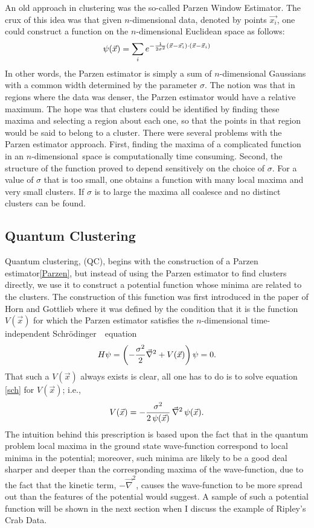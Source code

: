 \documentclass[fleqn,twoside]{article}
\def\be{\begin{equation}}
\def\ee{\end{equation}}
\newcommand{\Schrodinger}{Schr\"odinger\ }
\begin{document}
An old approach in clustering was the so-called Parzen Window
Estimator. The crux of this idea was that given $n$-dimensional
data, denoted by points $\vec{x_i}$, one could construct a function
on the $n$-dimensional Euclidean space as follows:
\be
    \psi(\vec{x}) = \sum_i
e^{-{1 \over 2 \sigma^2}(\vec{x} - \vec{x_i})\cdot (\vec{x} - \vec{x}_i)}
\label{Parzen}
\ee
In other words, the Parzen estimator is simply a sum of $n$-dimensional
Gaussians with a common width determined by the parameter $\sigma$.
The notion was that in regions where the data was denser, the Parzen estimator
would have a relative maximum.  The hope was that clusters could be
identified by finding these maxima and selecting a region about each
one, so that the points in that region would be said to belong to a
cluster.  There were several problems with the Parzen estimator approach.
First, finding the maxima of a complicated function in an $n$-dimensional\
space is computationally time consuming.  Second, the structure of the
function proved to depend sensitively on the choice of $\sigma$.  For
a value of $\sigma$ that is too small, one obtains a function with many
local maxima and very small clusters.  If $\sigma$ is to large the
maxima all coalesce and no distinct clusters can be found.

\subsection{Quantum Clustering}

Quantum clustering, (QC), begins with the construction of a Parzen
estimator\ref{Parzen}, but instead of using the Parzen estimator to
find clusters directly, we use it to construct a potential function
whose minima are related to the clusters.  The construction of this
function was first introduced in the paper of Horn and
Gottlieb\cite{qc1} where it was defined by the condition that it is
the function $V(\vec{x})$ for which the Parzen estimator satisfies
the $n$-dimensional time-independent \Schrodinger\ equation
\be
\label{sch}
    H\psi = \left(-{\sigma^2 \over 2}\vec{\nabla} ^2 + V({\vec{x}})\right)\psi = 0 .
\ee
That such a $V(\vec{x})$ always exists is clear, all one has to do
is to solve equation \ref{sch} for $V(\vec{x})$; i.e.,
\be
\label{Vofx}
  V(\vec{x}) =
  -{\sigma^2 \over 2\, \psi(\vec{x})}\,\vec{\nabla} ^2 \,\psi(\vec{x}) .
\ee
The intuition behind this prescription is based upon the fact that in
the quantum problem local maxima in the ground state wave-function
correspond to local minima in the potential; moreover, such minima are
likely to be a good deal sharper and deeper than the corresponding
maxima of the wave-function, due to the fact that the kinetic term,
$-\vec{\nabla}^2$, causes the wave-function to be more spread out
than the features of the potential would suggest.  A sample of such
a potential function will be shown in the next section when I
discuss the example of Ripley's Crab Data.
\end{document}
